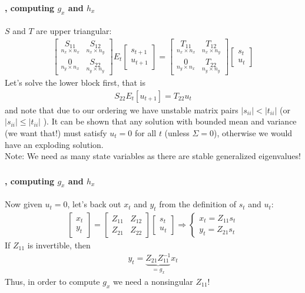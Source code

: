 \documentclass[handout]{beamer}  %
\begin{document}
\begin{frame}
\frametitle{\secname}\framesubtitle{\subsecname, computing $g_x$ and $h_x$}
$S$ and $T$ are upper triangular:
\begin{align*}
\begin{bmatrix} \underset{n_x \times n_x}{S_{11}} & \underset{n_x \times n_y}{S_{12}} \\ \underset{n_y \times n_x}{0} & \underset{n_y \times n_y}{S_{22}}\end{bmatrix} E_t \begin{bmatrix} s_{t+1}\\ u_{t+1} \end{bmatrix} = \begin{bmatrix} \underset{n_x \times n_x}{T_{11}} & \underset{n_x \times n_y}{T_{12}} \\ \underset{n_y \times n_x}{0} & \underset{n_y \times n_y}{T_{22}}\end{bmatrix} \begin{bmatrix} s_t \\ u_t \end{bmatrix}
\end{align*}
Let's solve the lower block first, that is
\begin{align*}
  S_{22} E_t[u_{t+1}] = T_{22} u_t
\end{align*}
and note that due to our ordering we have unstable matrix pairs $|s_{ii}|<|t_{ii}|$ (or $|s_{ii}|\leq|t_{ii}|$ ). It can be shown that any solution with bounded mean and variance (we want that!) must satisfy $u_t=0$ for all $t$ (unless $\Sigma=0$), otherwise we would have an exploding solution.\\
Note: We need as many state variables as there are stable generalized eigenvalues!
\end{frame}

\begin{frame}
\frametitle{\secname}\framesubtitle{\subsecname, computing $g_x$ and $h_x$}
Now given $u_t=0$, let's back out $x_t$ and $y_t$ from the definition of $s_t$ and $u_t$:
\begin{align*}
  \begin{bmatrix} x_t \\ y_t \end{bmatrix} = \begin{bmatrix} Z_{11} & Z_{12}\\ Z_{21} & Z_{22} \end{bmatrix} \begin{bmatrix} s_t \\ u_t \end{bmatrix}
  \Rightarrow
  \begin{cases}
    x_t = Z_{11} s_t\\
    y_t = Z_{21} s_t
  \end{cases}
\end{align*}
If $Z_{11}$ is invertible, then
\begin{align*}
  y_t = \underbrace{Z_{21} Z_{11}^{-1}}_{=g_x} x_t
\end{align*}
Thus, in order to compute $g_x$ we need a nonsingular $Z_{11}$!
\end{frame}
\end{document}
